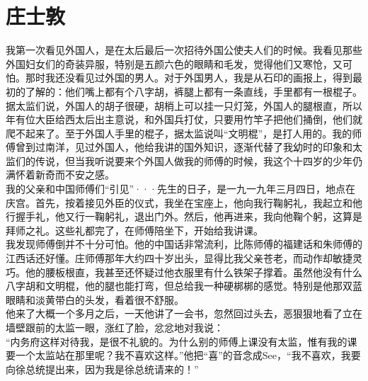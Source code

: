 \fancyhead[RO]{} %
\fancyhead[LE]{} %
\chapter*{庄士敦}
\thispagestyle{empty}
我第一次看见外国人，是在太后最后一次招待外国公使夫人们的时候。我看见那些外国妇女们的奇装异服，特别是五颜六色的眼睛和毛发，觉得他们又寒怆，又可怕。那时我还没看见过外国的男人。对于外国男人，我是从石印的画报上，得到最初的了解的：他们嘴上都有个八字胡，裤腿上都有一条直线，手里都有一根棍子。据太监们说，外国人的胡子很硬，胡梢上可以挂一只灯笼，外国人的腿根直，所以年有位大臣给西太后出主意说，和外国兵打仗，只要用竹竿子把他们捅倒，他们就爬不起来了。至于外国人手里的棍子，据太监说叫“文明棍”，是打人用的。我的师傅曾到过南洋，见过外国人，他给我讲的国外知识，逐渐代替了我幼时的印象和太监们的传说，但当我听说要来个外国人做我的师傅的时候，我这个十四岁的少年仍满怀着新奇而不安之感。\\

我的父亲和中国师傅们“引见”···先生的日子，是一九一九年三月四日，地点在庆宫。首先，按着接见外臣的仪式，我坐在宝座上，他向我行鞠躬礼，我起立和他行握手礼，他又行一鞠躬礼，退出门外。然后，他再进来，我向他鞠个躬，这算是拜师之礼。这些礼都完了，在师傅陪坐下，开始给我讲课。\\

我发现师傅倒并不十分可怕。他的中国话非常流利，比陈师傅的福建话和朱师傅的江西话还好懂。庄师傅那年大约四十岁出头，显得比我父亲苍老，而动作却敏捷灵巧。他的腰板根直，我甚至还怀疑过他衣服里有什么铁架子撑着。虽然他没有什么八字胡和文明棍，他的腿也能打弯，但总给我一种硬梆梆的感觉。特别是他那双蓝眼睛和淡黄带白的头发，看着很不舒服。\\

他来了大概一个多月之后，一天他讲了一会书，忽然回过头去，恶狠狠地看了立在墙壁跟前的太监一眼，涨红了脸，忿忿地对我说：\\

“内务府这样对待我，是很不礼貌的。为什么别的师傅上课没有太监，惟有我的课要一个太监站在那里呢？我不喜欢这样。”他把“喜”的音念成See，“我不喜欢，我要向徐总统提出来，因为我是徐总统请来的！”\\

